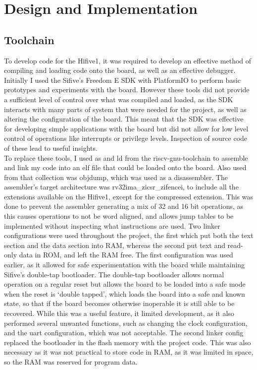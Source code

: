 \chapter{Design and Implementation}
\label{cha:design}
\section{Toolchain}
To develop code for the Hifive1, it was required to develop an effective method of compiling and loading code onto the board, as well as an effective debugger. Initially I used the Sifive's Freedom E SDK with PlatformIO to perform basic prototypes and experiments with the board. However these tools did not provide a sufficient level of control over what was compiled and loaded, as the SDK interacts with many parts of system that were needed for the project, as well as altering the configuration of the board. This meant that the SDK was effective for developing simple applications with the board but did not allow for low level control of operations like interrupts or privilege levels. Inspection of source code of these lead to useful insights.\\
To replace these tools, I used as and ld from the riscv-gnu-toolchain to assemble and link my code into an elf file that could be loaded onto the board. Also used from that collection was objdump, which was used as a disassembler. The assembler's target architecture was rv32ima\_zicsr\_zifencei, to include all the extensions available on the Hifive1, except for the compressed extension. This was done to prevent the assembler generating a mix of 32 and 16 bit operations, as this causes operations to not be word aligned, and allows jump tables to be implemented without inspecting what instructions are used. Two linker configurations were used throughout the project, the first which put both the text section and the data section into RAM, whereas the second put text and read-only data in ROM, and left the RAM free. The first configuration was used earlier, as it allowed for safe experimentation with the board while maintaining Sifive's double-tap bootloader. The double-tap bootloader allows normal operation on a regular reset but allows the board to be loaded into a safe mode when the reset is `double tapped', which loads the board into a safe and known state, so that if the board becomes otherwise inoperable it is still able to be recovered. While this was a useful feature, it limited development, as it also performed several unwanted functions, such as changing the clock configuration, and the uart configuration, which was not acceptable. The second linker config replaced the bootloader in the flash memory with the project code. This was also necessary as it was not practical to store code in RAM, as it was limited in space, so the RAM was reserved for program data.\\
